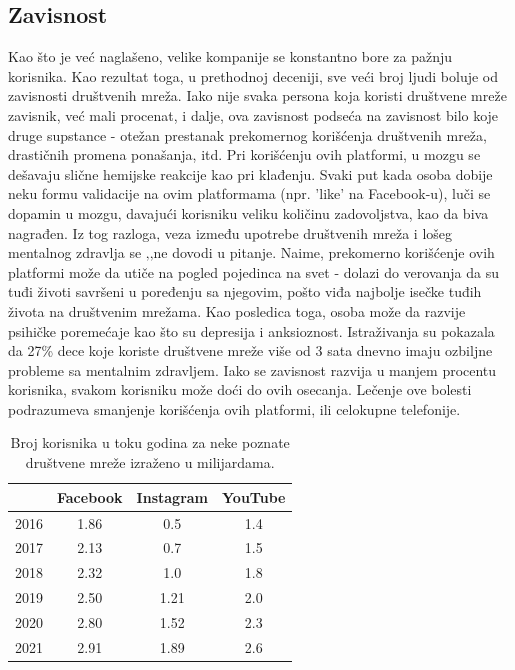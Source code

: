 \documentclass[a4paper]{article}
\begin{document}
\subsection{Zavisnost}
Kao što je već naglašeno, velike kompanije se konstantno bore za pažnju korisnika. Kao rezultat toga, u prethodnoj deceniji, sve veći broj ljudi boluje od zavisnosti društvenih mreža. Iako nije svaka persona koja koristi društvene mreže zavisnik, već mali procenat, i dalje, ova zavisnost podseća na zavisnost bilo koje druge supstance - otežan prestanak prekomernog korišćenja društvenih mreža, drastičnih promena ponašanja, itd. Pri korišćenju ovih platformi, u mozgu se dešavaju slične hemijske reakcije kao pri klađenju. \cite{zavisnost} Svaki put kada osoba dobije neku formu validacije na ovim platformama (npr. 'like' na Facebook-u), luči se dopamin u mozgu, davajući korisniku veliku količinu zadovoljstva, kao da biva nagrađen. Iz tog razloga, veza između upotrebe društvenih mreža i lošeg mentalnog zdravlja se ‚‚ne dovodi u pitanje. Naime, prekomerno korišćenje ovih platformi može da utiče na pogled pojedinca na svet - dolazi do verovanja da su tuđi životi savršeni u poređenju sa njegovim, pošto viđa najbolje isečke tuđih života na društvenim mrežama. Kao posledica toga, osoba može da razvije  psihičke poremećaje kao što su depresija i anksioznost. Istraživanja su pokazala da 27\% dece koje koriste društvene mreže više od 3 sata dnevno imaju ozbiljne probleme sa mentalnim zdravljem.
\newline 
Iako se zavisnost razvija u manjem procentu korisnika, svakom korisniku može doći do ovih osecanja. Lečenje ove bolesti podrazumeva smanjenje korišćenja ovih platformi, ili celokupne telefonije.


\begin{table}[h!]
\begin{center}

\begin{tabular}{|c|c|c|c|} \hline
 & Facebook & Instagram & YouTube\\ \hline
2016 & 1.86 & 0.5 & 1.4 \\ \hline
2017 & 2.13 & 0.7 & 1.5\\ \hline
2018 & 2.32 & 1.0 & 1.8 \\ \hline
2019 & 2.50 & 1.21 & 2.0 \\ \hline
2020 & 2.80 & 1.52 & 2.3 \\ \hline
2021 & 2.91 & 1.89 & 2.6 \\ \hline
\end{tabular}
\label{tab:tabela1}
\end{center}
\caption{Broj korisnika u toku godina za neke poznate društvene mreže izraženo u milijardama.}
\end{table}
 
\end{document}
